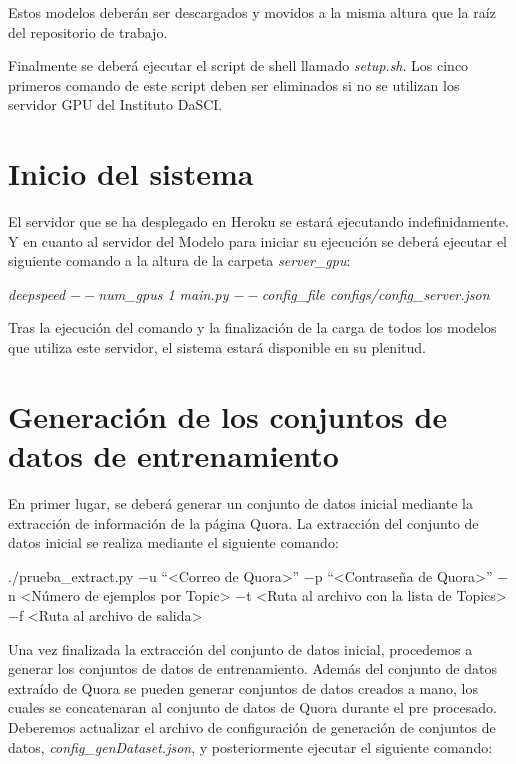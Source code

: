 Estos modelos deberán ser descargados y movidos a la misma altura que la raíz del repositorio de trabajo.

Finalmente se deberá ejecutar el script de shell llamado \textit{setup.sh}. Los cinco primeros comando de este script deben ser eliminados si no se utilizan los servidor GPU del Instituto DaSCI.

\section{Inicio del sistema}

El servidor que se ha desplegado en Heroku se estará ejecutando indefinidamente. Y en cuanto al servidor del Modelo para iniciar su ejecución se deberá ejecutar el siguiente comando a la altura de la carpeta \textit{server\_gpu}:

\begin{center}
    \textit{deepspeed $--$num\_gpus 1 main.py $--$config\_file configs/config\_server.json}
\end{center}

Tras la ejecución del comando y la finalización de la carga de todos los modelos que utiliza este servidor, el sistema estará disponible en su plenitud.


\section{Generación de los conjuntos de datos de entrenamiento}

En primer lugar, se deberá generar un conjunto de datos inicial mediante la extracción de información de la página Quora. La extracción del conjunto de datos inicial se realiza mediante el siguiente comando:

\begin{center}
    ./prueba\_extract.py $-$u ``<Correo de Quora>'' $-$p ``<Contraseña de Quora>'' $-$n <Número de ejemplos por Topic> $-$t <Ruta al archivo con la lista de Topics> $-$f <Ruta al archivo de salida>
\end{center}

Una vez finalizada la extracción del conjunto de datos inicial, procedemos a generar los conjuntos de datos de entrenamiento. Además del conjunto de datos extraído de Quora se pueden generar conjuntos de datos creados a mano, los cuales se concatenaran al conjunto de datos de Quora durante el pre procesado. Deberemos actualizar el archivo de configuración de generación de conjuntos de datos, \textit{config\_genDataset.json}, y posteriormente ejecutar el siguiente comando:

